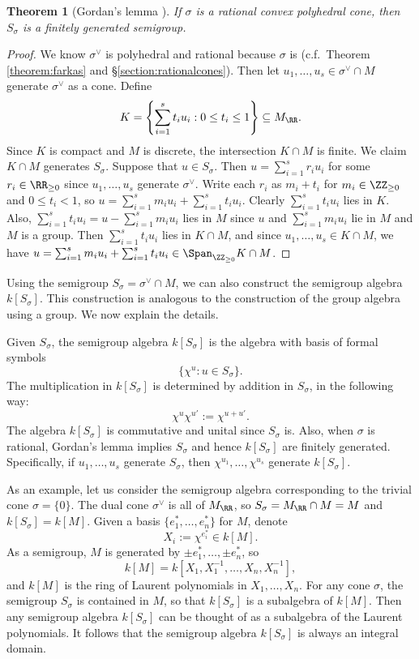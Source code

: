 \documentclass[12pt]{amsart}
\theoremstyle{plain}
\newtheorem{theorem}{Theorem}[subsection]
\begin{document}
\begin{theorem}[Gordan's lemma {\cite[\S 1.2]{Fulton93}}]\label{gordanslemma}
If $\sigma$ is a rational convex polyhedral cone, then $S_\sigma$ is a finitely generated semigroup.
\end{theorem}
\begin{proof}
We know $\sigma^\vee$ is polyhedral and rational because $\sigma$ is (c.f.\ Theorem \ref{theorem:farkas} and \S \ref{section:rationalcones}).
Then let $u_1, \ldots, u_s \in \sigma^\vee \cap M$ generate $\sigma^\vee$ as a cone.
Define
$$K = \left\{\sum_{i=1}^s t_i u_i : 0 \le t_i \le 1\right\} \subseteq M_\RR.$$
Since $K$ is compact and $M$ is discrete, the intersection $K \cap M$ is finite.
We claim $K \cap M$ generates $S_\sigma$.
Suppose that $u \in S_\sigma$.
Then $u =\sum_{i=1}^s r_i u_i$ for some $r_i \in \RR_{\ge 0}$ since $u_1, \ldots, u_s$ generate $\sigma^\vee$.
Write each $r_i$ as $m_i + t_i$ for $m_i \in \ZZ_{\ge 0}$ and $0 \le t_i < 1$, so $u = \sum_{i=1}^s m_i u_i + \sum_{i=1}^s t_i u_i$.
Clearly $\sum_{i=1}^s t_i u_i$ lies in $K$.
Also, $\sum_{i=1}^s t_i u_i = u - \sum_{i=1}^s m_i u_i$ lies in $M$ since $u$ and $\sum_{i=1}^s m_i u_i$ lie in $M$ and $M$ is a group.
Then $\sum_{i=1}^s t_i u_i$ lies in $K \cap M$, and since $u_1, \ldots, u_s \in K \cap M$, we have $u = \sum_{i=1}^s m_i u_i + \sum_{i=1}^s t_i u_i \in \Span_{\ZZ_{\ge 0}} K \cap M$.
\end{proof}

Using the semigroup $S_\sigma = \sigma^\vee \cap M$, we can also construct the semigroup algebra $k[S_\sigma]$.
This construction is analogous to the construction of the group algebra using a group.
We now explain the details.

Given $S_\sigma$, the semigroup algebra $k[S_\sigma]$ is the algebra with basis of formal symbols
$$\{\chi^u : u \in S_\sigma\}.$$
The multiplication in $k[S_\sigma]$ is determined by addition in $S_\sigma$, in the following way:
$$\chi^u \chi^{u'} := \chi^{u + u'}.$$
The algebra $k[S_\sigma]$ is commutative and unital since $S_\sigma$ is.
Also, when $\sigma$ is rational, Gordan's lemma implies $S_\sigma$ and hence $k[S_\sigma]$ are finitely generated.
Specifically, if $u_1, \ldots, u_s$ generate $S_\sigma$, then $\chi^{u_1}, \ldots, \chi^{u_s}$ generate $k[S_\sigma]$.

As an example, let us consider the semigroup algebra corresponding to the trivial cone $\sigma = \{0\}$.
The dual cone $\sigma^\vee$ is all of $M_\RR$, so $S_\sigma = M_\RR \cap M = M$ and $k[S_\sigma]=k[M]$. 
Given a basis $\{e_1^*, \ldots, e_n^*\}$ for $M$, denote
$$X_i := \chi^{e_i^*} \in k[M].$$
As a semigroup, $M$ is generated by $\pm e_1^*, \ldots, \pm e_n^*$, so
$$k[M] = k[X_1, X_1^{-1}, \ldots, X_n, X_n^{-1}],$$
and $k[M]$ is the ring of Laurent polynomials in $X_1, \ldots, X_n$.
For any cone $\sigma$, the semigroup $S_\sigma$ is contained in $M$, so that $k[S_\sigma]$ is a subalgebra of $k[M]$. 
Then any semigroup algebra $k[S_\sigma]$ can be thought of as a subalgebra of the Laurent polynomials.
It follows that the semigroup algebra $k[S_\sigma]$ is always an integral domain.
\end{document}
